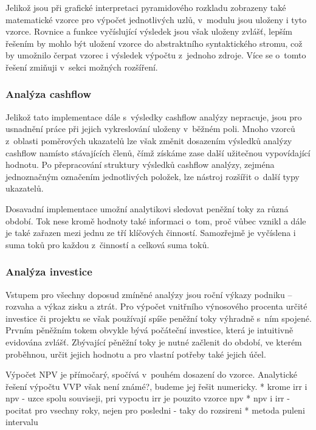 Jelikož jsou při grafické interpretaci pyramidového rozkladu zobrazeny také matematické vzorce pro výpočet jednotlivých uzlů, v~modulu jsou uloženy i tyto vzorce. Rovnice a funkce vyčíslující výsledek jsou však uloženy zvlášť, lepším řešením by mohlo být uložení vzorce do abstraktního syntaktického stromu, což by umožnilo čerpat vzorec i výsledek výpočtu z~jednoho zdroje. Více se o~tomto řešení zmiňuji v~sekci možných rozšíření.

\subsubsection{Analýza cashflow}
Jelikož tato implementace dále s~výsledky cashflow analýzy nepracuje, jsou pro usnadnění práce při jejich vykreslování uloženy v~běžném poli. Mnoho vzorců z~oblasti poměrových ukazatelů lze však změnit dosazením výsledků analýzy cashflow namísto stávajících členů, čímž získáme zase další užitečnou vypovídající hodnotu. Po přepracování struktury výsledků cashflow analýzy, zejména jednoznačným označením jednotlivých položek, lze nástroj rozšířit o~další typy ukazatelů.

Dosavadní implementace umožní analytikovi sledovat peněžní toky za různá období. Tok nese kromě hodnoty také informaci o~tom, proč vůbec vznikl a dále je také zařazen mezi jednu ze tří klíčových činností. Samozřejmě je vyčíslena i suma toků pro každou z~činností a celková suma toků.

\subsubsection{Analýza investice}
\label{irr}
Vstupem pro všechny doposud zmíněné analýzy jsou roční výkazy podniku -- rozvaha a výkaz zisku a ztrát. Pro výpočet vnitřního výnosového procenta určité investice či projektu se však používají spíše peněžní toky výhradně s~ním spojené. Prvním pěněžním tokem obvykle bývá počáteční investice, která je intuitivně evidována zvlášť. Zbývající pěněžní toky je nutné začlenit do období, ve kterém proběhnou, určit jejich hodnotu a pro vlastní potřeby také jejich účel.

Výpočet NPV je přímočarý, spočívá v~pouhém dosazení do vzorce. Analytické řešení výpočtu VVP však není známé?, budeme jej řešit numericky. 
* krome irr i npv - uzce spolu souviseji, pri vypoctu irr je pouzito vzorce npv
* npv i irr - pocitat pro vsechny roky, nejen pro posledni - taky do rozsireni
* metoda puleni intervalu



